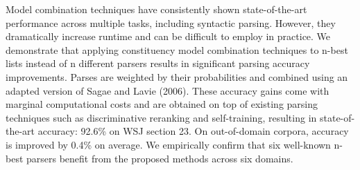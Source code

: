 Model combination techniques have consistently shown state-of-the-art performance across multiple tasks, including syntactic parsing. However, they dramatically increase runtime and can be difficult to employ in practice. We demonstrate that applying constituency model combination techniques to n-best lists instead of n different parsers results in significant parsing accuracy improvements. Parses are weighted by their probabilities and combined using an adapted version of Sagae and Lavie (2006). These accuracy gains come with marginal computational costs and are obtained on top of existing parsing techniques such as discriminative reranking and self-training, resulting in state-of-the-art accuracy: 92.6\% on WSJ section 23. On out-of-domain corpora, accuracy is improved by 0.4\% on average. We empirically confirm that six well-known n-best parsers benefit from the proposed methods across six domains.
